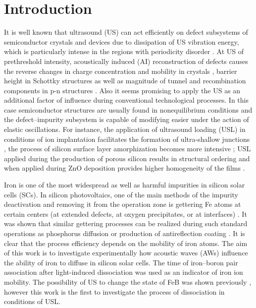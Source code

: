 \section{Introduction}
\label{intro}
It is well known that ultrasound (US) can act efficiently on defect subsystems of semiconductor crystals and devices due to dissipation of US vibration energy, which is particularly intense in the regions with periodicity disorder \cite{ostapenko2002,Savkina2013,Olikh2018JAP}.
At US of prethreshold intensity, acoustically induced (AI) reconstruction of defects causes the reverse changes in charge concentration and mobility in crystals \cite{Davletova2008,Olikh2020JEM},
barrier height in Schottky structures \cite{Olikh:Ultras,OlikhJAP}
as well as magnitude of tunnel and recombination components in p-n structures \cite{Teterkin2009,Olikh2018JAP}.
Also it seems promising to apply the US as an additional factor of influence during conventional technological processes.
In this case semiconductor structures are usually found in  nonequilibrium conditions and the defect--impurity subsystem is capable of modifying easier under the action of elastic oscillations.
For instance, the application of ultrasound loading (USL) in conditions of ion implantation facilitates
the formation of ultra-shallow junctions \cite{USImplant:JVacSci},
the process of silicon surface layer amorphization becomes more intensive \cite{RomanyukSST};
USL applied during the production of porous silicon  results in structural ordering \cite{Kalem2000}
and when applied during ZnO deposition provides higher homogeneity of the films \cite{US:ZnOfilm}.

Iron is one of the most widespread as well as harmful impurities in silicon solar cells (SCs).
In silicon photovoltaics, one of the main methods of the impurity deactivation and removing it from the operation zone is gettering Fe atoms at certain centers (at extended defects, at oxygen precipitates, or at interfaces) \cite{LaineIEEEPV2016}.
It was shown that similar gettering processes can be realized during such standard operations as phosphorus diffusion  \cite{FeB:Vahanissi}
or production of antireflection coating  \cite{Teimuraz2014JAP}.
It is clear that the process efficiency depends on the mobility of iron atoms.
The aim of this work is to investigate experimentally how acoustic waves (AWs) influence the ability of iron to diffuse in silicon solar cells.
The time of iron--boron pair association after  light-induced dissociation was used as an indicator of iron ion mobility.
The possibility of US to change the state of FeB was shown previously  \cite{Ostapenko1995},
however this work is the first to investigate the process of dissociation in conditions of USL.

